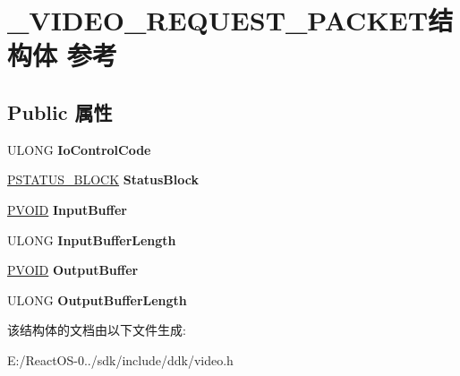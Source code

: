 \hypertarget{struct___v_i_d_e_o___r_e_q_u_e_s_t___p_a_c_k_e_t}{}\section{\+\_\+\+V\+I\+D\+E\+O\+\_\+\+R\+E\+Q\+U\+E\+S\+T\+\_\+\+P\+A\+C\+K\+E\+T结构体 参考}
\label{struct___v_i_d_e_o___r_e_q_u_e_s_t___p_a_c_k_e_t}
\subsection*{Public 属性}
\begin{DoxyCompactItemize}
\item 
\mbox{\label{struct___v_i_d_e_o___r_e_q_u_e_s_t___p_a_c_k_e_t_a80afda63f63a68a4ad323f3ca5dbb913}} 
U\+L\+O\+NG {\bfseries Io\+Control\+Code}
\item 
\mbox{\label{struct___v_i_d_e_o___r_e_q_u_e_s_t___p_a_c_k_e_t_a670cf251225975d3ac3a4697085f0bc9}} 
\hyperlink{struct___s_t_a_t_u_s___b_l_o_c_k}{P\+S\+T\+A\+T\+U\+S\+\_\+\+B\+L\+O\+CK} {\bfseries Status\+Block}
\item 
\mbox{\label{struct___v_i_d_e_o___r_e_q_u_e_s_t___p_a_c_k_e_t_a0fd3be7d2848d82a8ca35dafbb95f8ff}} 
\hyperlink{interfacevoid}{P\+V\+O\+ID} {\bfseries Input\+Buffer}
\item 
\mbox{\label{struct___v_i_d_e_o___r_e_q_u_e_s_t___p_a_c_k_e_t_a06aa7d4a68438a0e19049a1779e6a90d}} 
U\+L\+O\+NG {\bfseries Input\+Buffer\+Length}
\item 
\mbox{\label{struct___v_i_d_e_o___r_e_q_u_e_s_t___p_a_c_k_e_t_a611a49e842b9b86e17e7c202d1cc3cc7}} 
\hyperlink{interfacevoid}{P\+V\+O\+ID} {\bfseries Output\+Buffer}
\item 
\mbox{\label{struct___v_i_d_e_o___r_e_q_u_e_s_t___p_a_c_k_e_t_aaf4e0e11bec55053ad1f3cdf7b84fb06}} 
U\+L\+O\+NG {\bfseries Output\+Buffer\+Length}
\end{DoxyCompactItemize}


该结构体的文档由以下文件生成\+:\begin{DoxyCompactItemize}
\item 
E\+:/\+React\+O\+S-\/0../sdk/include/ddk/video.\+h\end{DoxyCompactItemize}

